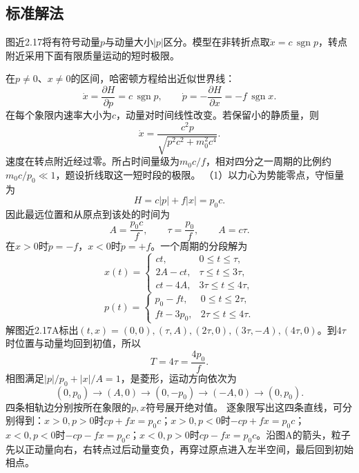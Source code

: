 \documentclass[UTF8,fontset=fandol,a4paper,11pt]{ctexart}
\begin{document}

\subsection*{标准解法}


图近2.17将有符号动量$p$与动量大小$|p|$区分。模型在非转折点取$\dot x=c\,\operatorname{sgn}p$，转点附近采用下面有限质量运动的短时极限。

在$p\ne0$、$x\ne0$的区间，哈密顿方程给出近似世界线：
\[
\dot x=\frac{\partial H}{\partial p}=c\,\operatorname{sgn}p,\qquad
\dot p=-\frac{\partial H}{\partial x}=-f\,\operatorname{sgn}x.
\]
在每个象限内速率大小为$c$，动量对时间线性改变。若保留小的静质量，则
\[
\dot x=\frac{c^2p}{\sqrt{p^2c^2+m_0^2c^4}}.
\]
速度在转点附近经过零。所占时间量级为$m_0c/f$，相对四分之一周期的比例约$m_0c/p_0\ll1$，题设折线取这一短时段的极限。
（1）以力心为势能零点，守恒量为
\[
H=c|p|+f|x|=p_0c.
\]
因此最远位置和从原点到该处的时间为
\[
A=\frac{p_0c}{f},\qquad
\tau=\frac{p_0}{f},\qquad A=c\tau.
\]
在$x>0$时$\dot p=-f$，$x<0$时$\dot p=+f$。一个周期的分段解为
\[
x(t)=
\begin{cases}
ct,&0\le t\le\tau,\\
2A-ct,&\tau\le t\le3\tau,\\
ct-4A,&3\tau\le t\le4\tau,
\end{cases}
\]
\[
p(t)=
\begin{cases}
p_0-ft,&0\le t\le2\tau,\\
ft-3p_0,&2\tau\le t\le4\tau.
\end{cases}
\]
解图近2.17A标出$(t,x)=(0,0),(\tau,A),(2\tau,0),(3\tau,-A),(4\tau,0)$。到$4\tau$时位置与动量均回到初值，所以
\[
\boxed{T=4\tau=\frac{4p_0}{f}}.
\]
相图满足$|p|/p_0+|x|/A=1$，是菱形，运动方向依次为
\[
(0,p_0)\longrightarrow(A,0)\longrightarrow(0,-p_0)
\longrightarrow(-A,0)\longrightarrow(0,p_0).
\]
四条相轨边分别按所在象限的$p,x$符号展开绝对值。
逐象限写出这四条直线，可分别得到：$x>0,p>0$时$cp+fx=p_0c$；$x>0,p<0$时$-cp+fx=p_0c$；$x<0,p<0$时$-cp-fx=p_0c$；$x<0,p>0$时$cp-fx=p_0c$。沿图A的箭头，粒子先以正动量向右，右转点过后动量变负，再穿过原点进入左半空间，最后回到初始相点。
\end{document}
